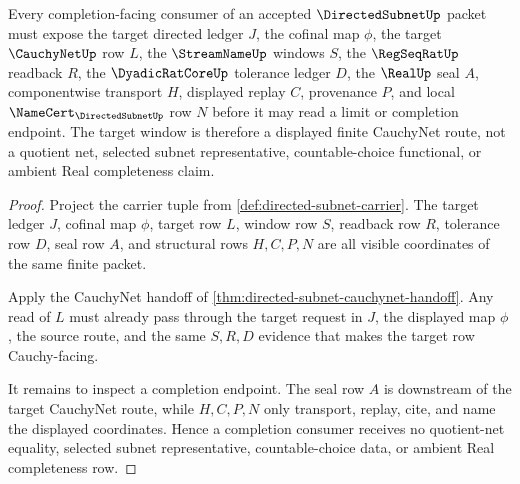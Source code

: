 \begin{theorem}
\label{thm:directed-subnet-target-cauchy-window}
Every completion-facing consumer of an accepted $\DirectedSubnetUp$ packet must expose the target directed ledger $J$, the cofinal map $\phi$, the target $\CauchyNetUp$ row $L$, the $\StreamNameUp$ windows $S$, the $\RegSeqRatUp$ readback $R$, the $\DyadicRatCoreUp$ tolerance ledger $D$, the $\RealUp$ seal $A$, componentwise transport $H$, displayed replay $C$, provenance $P$, and local $\NameCert_{\DirectedSubnetUp}$ row $N$ before it may read a limit or completion endpoint. The target window is therefore a displayed finite CauchyNet route, not a quotient net, selected subnet representative, countable-choice functional, or ambient Real completeness claim.
\end{theorem}
\begin{proof}
Project the carrier tuple from \autoref{def:directed-subnet-carrier}. The target ledger $J$, cofinal map $\phi$, target row $L$, window row $S$, readback row $R$, tolerance row $D$, seal row $A$, and structural rows $H,C,P,N$ are all visible coordinates of the same finite packet.

Apply the CauchyNet handoff of \autoref{thm:directed-subnet-cauchynet-handoff}. Any read of $L$ must already pass through the target request in $J$, the displayed map $\phi$, the source route, and the same $S,R,D$ evidence that makes the target row Cauchy-facing.

It remains to inspect a completion endpoint. The seal row $A$ is downstream of the target CauchyNet route, while $H,C,P,N$ only transport, replay, cite, and name the displayed coordinates. Hence a completion consumer receives no quotient-net equality, selected subnet representative, countable-choice data, or ambient Real completeness row.
\end{proof}

